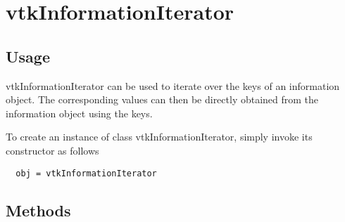 \section{vtkInformationIterator}

\subsection{Usage}

 vtkInformationIterator can be used to iterate over the keys of an
 information object. The corresponding values can then be directly
 obtained from the information object using the keys.


To create an instance of class vtkInformationIterator, simply
invoke its constructor as follows
\begin{verbatim}
  obj = vtkInformationIterator
\end{verbatim}
\subsection{Methods}

